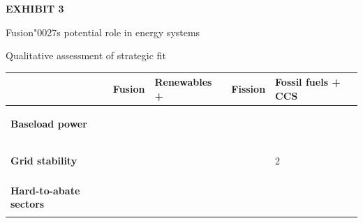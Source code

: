 \documentclass[10pt,a4paper]{article}
\newcommand{\BOApos}{{\BOQuoteFont\char"0027}}
\begin{document}
\clearpage
{\textcolor{BOGreen}{\scriptsize\bfseries EXHIBIT 3}}\par\vspace{3pt}
{\sffamily\fontsize{15}{19}\selectfont\color{BONavy} Fusion\BOApos{}s potential role in energy systems}\par
{\small\color{BOText} Qualitative assessment of strategic fit}\par\vspace{4pt}
{\scriptsize\begin{tabular}{p{38mm}>{\centering\arraybackslash}p{21mm}>{\centering\arraybackslash}p{21mm}>{\centering\arraybackslash}p{21mm}>{\centering\arraybackslash}p{21mm}}
 & {\bfseries Fusion} & {\bfseries Renewables +} & {\bfseries Fission} & {\bfseries Fossil fuels + CCS} \\
\hline
{\bfseries Baseload power} & \colorbox{BOGreen}{\textcolor{white}{\strut\hspace{5pt}4\hspace{5pt}}} & \colorbox{BOGreen}{\textcolor{white}{\strut\hspace{5pt}5\hspace{5pt}}} & \colorbox{BOGreen}{\textcolor{white}{\strut\hspace{5pt}4\hspace{5pt}}} & \colorbox{BOBlue}{\textcolor{white}{\strut\hspace{5pt}3\hspace{5pt}}} \\
{\bfseries Grid stability} & \colorbox{BOBlue}{\textcolor{white}{\strut\hspace{5pt}3\hspace{5pt}}} & \colorbox{BOGreen}{\textcolor{white}{\strut\hspace{5pt}4\hspace{5pt}}} & \colorbox{BOBlue}{\textcolor{white}{\strut\hspace{5pt}3\hspace{5pt}}} & \colorbox{BOLight}{\textcolor{BOText}{\strut\hspace{5pt}2\hspace{5pt}}} \\
{\bfseries Hard-to-abate sectors} & \colorbox{BOGreen}{\textcolor{white}{\strut\hspace{5pt}4\hspace{5pt}}} & \colorbox{BOBlue}{\textcolor{white}{\strut\hspace{5pt}3\hspace{5pt}}} & \colorbox{BOBlue}{\textcolor{white}{\strut\hspace{5pt}3\hspace{5pt}}} & \colorbox{BOGreen}{\textcolor{white}{\strut\hspace{5pt}4\hspace{5pt}}} \\

\end{tabular}}
\end{document}
